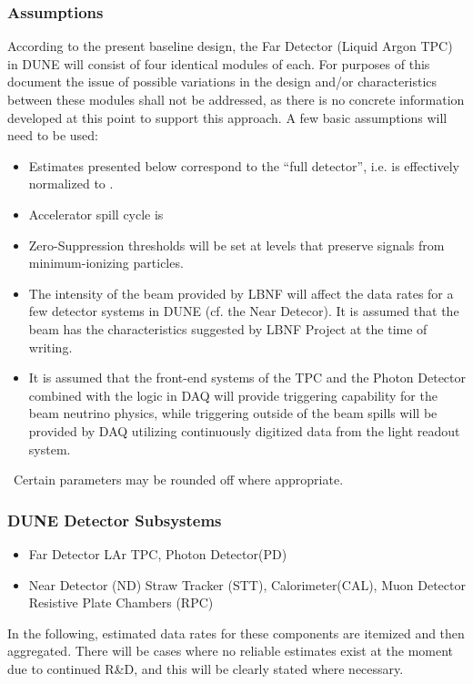 \subsubsection{Assumptions}
\label{sec:detectors-sc-infrastructure-assumptions}
According to the present baseline design, the Far Detector (Liquid Argon TPC) in DUNE will consist
of four identical modules of \tpcdetectormass each.
For purposes of this document the issue of possible variations in the design and/or characteristics
between these modules shall not be addressed, as there is no concrete information developed at
this point to support this approach. A few basic assumptions will need to be used:
\begin{itemize}
\item Estimates presented below correspond to the ``full detector'', i.e. is effectively
normalized to \dunedetectormass.
\item Accelerator spill cycle is \beamspillcycle
\item Zero-Suppression thresholds will be set at levels that preserve signals from minimum-ionizing particles.
\item The intensity of the beam provided by LBNF will affect the data rates for a few detector
systems in DUNE (cf. the Near Detecor).
It is assumed that the beam has the characteristics suggested by LBNF Project at the time of writing.
\item It is assumed that the front-end systems of the TPC and the Photon Detector combined
with the logic in DAQ will provide triggering capability for the beam neutrino physics, while
triggering outside of the beam spills will be provided by DAQ utilizing continuously digitized
data from the light readout system.
\end{itemize}
\
Certain parameters may be rounded off where appropriate.

\subsubsection{DUNE Detector Subsystems}
\begin{itemize}
\item Far Detector LAr TPC, Photon Detector(PD)
\item Near Detector (ND) Straw Tracker (STT), Calorimeter(CAL), Muon Detector Resistive Plate Chambers (RPC)
\end{itemize}

In the following, estimated data rates for these components are itemized and then aggregated.
There will be cases where no reliable estimates exist at the moment due to continued R\&D, and this will
be clearly stated where necessary.

